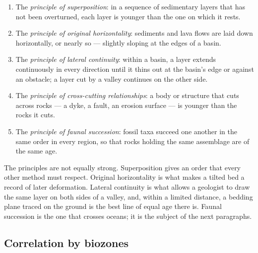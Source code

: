 \begin{definition}\label{def:b1:stratigraphic-scale:principles}
\begin{enumerate}
  \item The \emph{principle of superposition}: in a sequence of sedimentary layers that has not been overturned,
        each layer is younger than the one on which it rests.
  \item The \emph{principle of original horizontality}: sediments and lava flows are laid down
        horizontally, or nearly so --- slightly sloping at the edges of a
        basin.
  \item The \emph{principle of lateral continuity}: within a basin, a layer extends continuously in every
        direction until it thins out at the basin's edge or against an
        obstacle; a layer cut by a valley continues on the other side.
  \item The \emph{principle of cross-cutting relationships}: a body or structure that cuts across
        rocks --- a dyke, a fault, an erosion surface --- is younger than the
        rocks it cuts.
  \item The \emph{principle of faunal succession}: fossil taxa succeed one another in the same order in
        every region, so that rocks holding the same assemblage are of the same
        age.
\end{enumerate}
\end{definition}

The principles are not equally strong. Superposition gives an order that every
other method must respect. Original horizontality is what makes a tilted bed a
record of later deformation. Lateral continuity is what allows a geologist to
draw the same layer on both sides of a valley, and, within a limited distance, a
bedding plane traced on the ground is the best line of equal age there is.
Faunal succession is the one that crosses oceans; it is the subject of the next
paragraphs.

\subsection*{Correlation by biozones}

